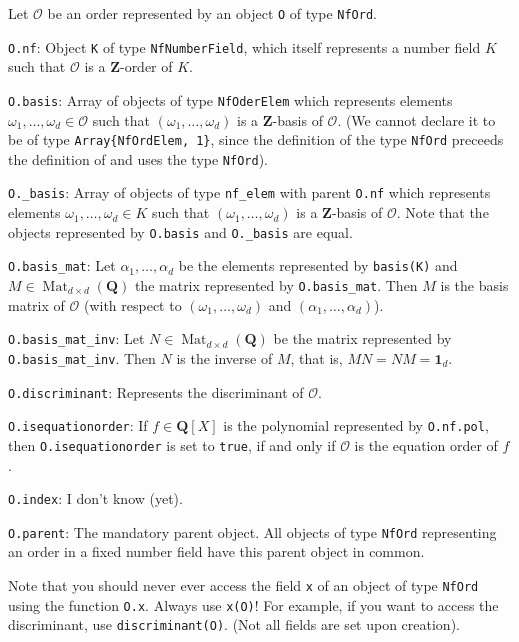 \documentclass[a4paper,10pt]{article}
\newcommand{\Z}{\mathbf{Z}}
\newcommand{\Q}{\mathbf{Q}}
\newcommand{\code}{\lstinline}
\newcommand{\Mat}{\operatorname{Mat}}
\newcommand*{\descitem}{%
\everyhbox{\everyhbox{}\aftergroup\finishdescitem}%
\setbox\itembox\hbox
}
\newcommand*{\finishdescitem}{%
\everyhbox{}%
\item[\box\itembox]%
}
\begin{document}
Let $\mathcal O$ be an order represented by an object \code{O} of type \code{NfOrd}. 

\begin{description}
\descitem{\code{O.nf}:} Object \code{K} of type \code{NfNumberField}, which itself represents a number field $K$ such that $\mathcal O$ is a $\Z$-order of $K$.

\descitem{\code{O.basis}:} Array of objects of type \code{NfOderElem} which represents elements $\omega_1,\dotsc,\omega_d \in \mathcal O$ such that $(\omega_1,\dotsc,\omega_d)$ is a $\Z$-basis of $\mathcal O$.
(We cannot declare it to be of type \lstinline!Array{NfOrdElem, 1}!, since the definition of the type \code{NfOrd} preceeds the definition of and uses the type \code{NfOrd}).

\descitem{\code{O._basis}:} Array of objects of type \code{nf_elem} with parent \code{O.nf} which represents elements $\omega_1,\dotsc,\omega_d \in K$ such that $(\omega_1,\dotsc,\omega_d)$ is a $\Z$-basis of $\mathcal O$. Note that the objects represented by \code{O.basis} and \code{O._basis} are equal.

\descitem{\code{O.basis_mat}:} Let $\alpha_1,\dotsc,\alpha_d$ be the elements represented by \code{basis(K)} and $M \in \Mat_{d\times d}(\Q)$ the matrix represented by \code{O.basis_mat}. Then $M$ is the basis matrix of $\mathcal O$ (with respect to $(\omega_1,\dotsc,\omega_d)$ and $(\alpha_1,\dotsc,\alpha_d)$).

\descitem{\code{O.basis_mat_inv}:} Let $N \in \Mat_{d \times d}(\Q)$ be the matrix represented by \code{O.basis_mat_inv}. Then $N$ is the inverse of $M$, that is, $M N = N M = \mathbf{1}_d$.

\descitem{\code{O.discriminant}:} Represents the discriminant of $\mathcal O$.

\descitem{\code{O.isequationorder}:} If $f \in \Q[X]$ is the polynomial represented by \code{O.nf.pol}, then \code{O.isequationorder} is set to \code{true}, if and only if $\mathcal O$ is the equation order of $f$.

\descitem{\code{O.index}:} I don't know (yet).

\descitem{\code{O.parent}:} The mandatory parent object. All objects of type \code{NfOrd} representing an order in a fixed number field have this parent object in common.
\end{description}

Note that you should never ever access the field \code{x} of an object of type \code{NfOrd} using the function \code{O.x}. Always use \code{x(O)}!
For example, if you want to access the discriminant, use \code{discriminant(O)}.
(Not all fields are set upon creation).
\end{document}
